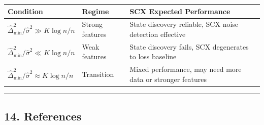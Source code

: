 \documentclass[
  12pt,
]{article}
\begin{document}
\begin{longtable}[]{@{}
  >{\raggedright\arraybackslash}p{}
  >{\raggedright\arraybackslash}p{}
  >{\raggedright\arraybackslash}p{}@{}}
\toprule\noalign{}
\begin{minipage}[b]{\linewidth}\raggedright
Condition
\end{minipage} & \begin{minipage}[b]{\linewidth}\raggedright
Regime
\end{minipage} & \begin{minipage}[b]{\linewidth}\raggedright
SCX Expected Performance
\end{minipage} \\
\midrule\noalign{}
\endhead
\bottomrule\noalign{}
\endlastfoot
\(\hat{\Delta}_{\min}^2 / \hat{\sigma}^2 \gg K \log n / n\) & Strong
features & State discovery reliable, SCX noise detection effective \\
\(\hat{\Delta}_{\min}^2 / \hat{\sigma}^2 \ll K \log n / n\) & Weak
features & State discovery fails, SCX degenerates to loss baseline \\
\(\hat{\Delta}_{\min}^2 / \hat{\sigma}^2 \approx K \log n / n\) &
Transition & Mixed performance, may need more data or stronger
features \\
\end{longtable}

\begin{center}\rule{0.5\linewidth}{0.5pt}\end{center}

\subsection{14. References}\label{references}
\end{document}
